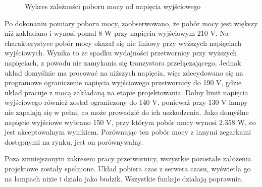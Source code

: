 \documentclass[../main.tex]{subfiles}
\begin{document}
\begin{figure}[H]
  \centering
  \caption{Wykres zależności poboru mocy od napięcia wyjściowego}
  \label{fig:power}
\end{figure}

Po dokonaniu pomiary poboru mocy, zaobserwowano, że pobór mocy jest większy niż zakładano i wynosi ponad 8 W przy napięciu wyjściowym 210 V.
Na charakterystyce pobór mocy okazał się nie liniowy przy wyższych napięciach wyjściowych. Wynika to ze spadku wydajności przetwornicy przy wyższych napięciach,
z powodu nie zamykania się tranzystora przełączającego. Jednak układ domyślnie ma procować na niższych napięcia, więc 
zdecydowano się na programowe ograniczenie napięcia wyjściowego przetwornicy do 190 V, gdzie układ pracuje z mocą zakładaną na etapie projektowania. Dolny limit napięcia wyjściowego również
został ograniczony do 140 V, ponieważ przy 130 V lampy nie zapalają się w pełni, co może prowadzić do ich uszkodzenia. 
Jako domyślne napięcie wyjściowe wybrano 150 V, przy którym pobór mocy wynosi 2.358 W, co jest akceptowalnym wynikiem.
Porównując ten pobór mocy z innymi zegarkami dostępnymi na rynku, jest on porównywalny.

Poza zmniejszonym zakresem pracy przetwornicy, wszystkie pozostałe założenia projektowe zostały spełnione. Układ 
pobiera czas z serwera czasu, wyświetla go na lampach nixie i działa jako budzik. Wszystkie funkcje działają poprawnie.
\end{document}
